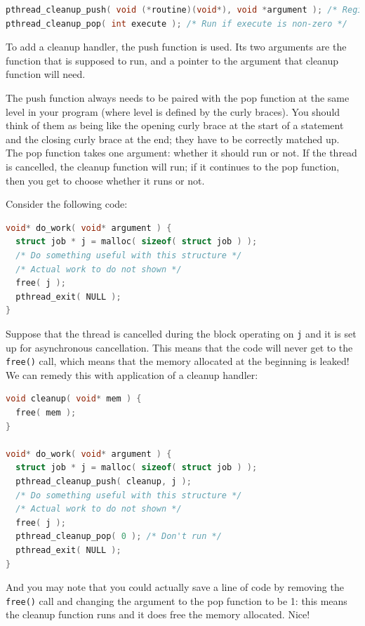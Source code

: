 \begin{lstlisting}[language=C]
pthread_cleanup_push( void (*routine)(void*), void *argument ); /* Register cleanup handler, with argument */
pthread_cleanup_pop( int execute ); /* Run if execute is non-zero */
\end{lstlisting}

To add a cleanup handler, the push function is used. Its two arguments are the function that is supposed to run, and a pointer to the argument that cleanup function will need.

The push function always needs to be paired with the pop function at the same level in your program (where level is defined by the curly braces). You should think of them as being like the opening curly brace at the start of a statement and the closing curly brace at the end; they have to be correctly matched up. The pop function takes one argument: whether it should run or not. If the thread is cancelled, the cleanup function will run; if it continues to the pop function, then you get to choose whether it runs or not.

Consider the following code:
\begin{lstlisting}[language=C]
void* do_work( void* argument ) {
  struct job * j = malloc( sizeof( struct job ) );
  /* Do something useful with this structure */
  /* Actual work to do not shown */
  free( j );
  pthread_exit( NULL );
}
\end{lstlisting}

Suppose that the thread is cancelled during the block operating on \texttt{j} and it is set up for asynchronous cancellation. This means that the code will never get to the \texttt{free()} call, which means that the memory allocated at the beginning is leaked! We can remedy this with application of a cleanup handler:
\begin{lstlisting}[language=C]
void cleanup( void* mem ) {
  free( mem );
}

void* do_work( void* argument ) {
  struct job * j = malloc( sizeof( struct job ) );
  pthread_cleanup_push( cleanup, j );
  /* Do something useful with this structure */
  /* Actual work to do not shown */
  free( j );
  pthread_cleanup_pop( 0 ); /* Don't run */
  pthread_exit( NULL );
}
\end{lstlisting}

And you may note that you could actually save a line of code by removing the \texttt{free()} call and changing the argument to the pop function to be 1: this means the cleanup function runs and it does free the memory allocated. Nice!


